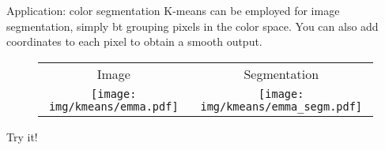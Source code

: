 \begin{frame}{Application: color segmentation}
K-means can be employed for image segmentation, simply bt grouping pixels in the color space. You can also add coordinates to each pixel to obtain a smooth output.
\begin{figure}
\begin{tabular}{cc}
\small{Image} & \small{Segmentation}\\
\texttt{[image: img/kmeans/emma.pdf]}&
\texttt{[image: img/kmeans/emma\_segm.pdf]}
\end{tabular}
\end{figure}
Try it!
\end{frame}
